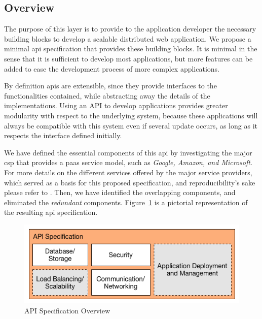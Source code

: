\documentclass[12pt, titlepage]{uo_temp}
\begin{document}
     \subsection{Overview}
     The purpose of this layer is to provide to the application developer the necessary
     building blocks to develop a scalable distributed web application. We propose a
     minimal \gls{api} specification that provides these building blocks. It is minimal in
     the sense that it is sufficient to develop most applications, but more features
     can be added to ease the development process of more complex applications.

     By definition \gls{api}s are extensible, since they provide interfaces to the
     functionalities contained, while abstracting away the details of the
     implementations. Using an API to develop applications provides greater modularity
     with respect to the underlying system, because these applications will always be
     compatible with this system even if several update occurs, as long as it respects the
     interface defined initially. 

     We have defined the essential components of this \gls{api} by investigating the major
     \gls{csp} that provides a \gls{paas} service model, such as \emph{Google, Amazon, and
       Microsoft}. For more details on the different services offered by the major service
     providers, which served as a basis for this proposed specification, and
     reproducibility's sake please refer to \cite{gae_web} \cite{AWS} \cite{azure}. Then,
     we have identified the overlapping components, and eliminated the \emph{redundant}
     components. Figure~\ref{api_spec_overview} is a pictorial representation of the
     resulting \gls{api} specification.
    
     \begin{figure}[h]
       \centering
       \includegraphics[width=125mm]{images/api_overview.png}
     \caption{API Specification Overview}
     \label{api_spec_overview}
     \end{figure}
\end{document}
